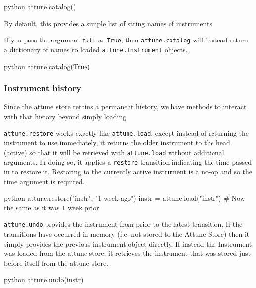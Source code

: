 \begin{codefragment}{python}
attune.catalog()
\end{codefragment}

By default, this provides a simple list of string names of instruments.

If you pass the argument \texttt{full} as \texttt{True}, then
\texttt{attune.catalog} will instead return a dictionary of names to
loaded \texttt{attune.Instrument} objects.

\begin{codefragment}{python}
attune.catalog(True)
\end{codefragment}

\hypertarget{instrument-history}{%
\subsubsection{Instrument history}\label{instrument-history}}

Since the attune store retains a permanent history, we have methods to
interact with that history beyond simply loading

\hypertarget{restore}{%
\label{restore}}

\texttt{attune.restore} works exactly like \texttt{attune.load}, except
instead of returning the instrument to use immediately, it returns the
older instrument to the head (active) so that it will be retrieved with
\texttt{attune.load} without additional arguments. In doing so, it
applies a \texttt{restore} transition indicating the time passed in to
restore it. Restoring to the currently active instrument is a no-op and
so the time argument is required.

\begin{codefragment}{python}
attune.restore("instr", "1 week ago")
instr = attune.load("instr")  # Now the same as it was 1 week prior
\end{codefragment}

\hypertarget{undo}{%
\label{undo}}

\texttt{attune.undo} provides the instrument from prior to the latest
transition. If the transitions have occurred in memory (i.e. not stored
to the Attune Store) then it simply provides the previous instrument
object directly. If instead the Instrument was loaded from the attune
store, it retrieves the instrument that was stored just before itself
from the attune store.

\begin{codefragment}{python}
attune.undo(instr)
\end{codefragment}


